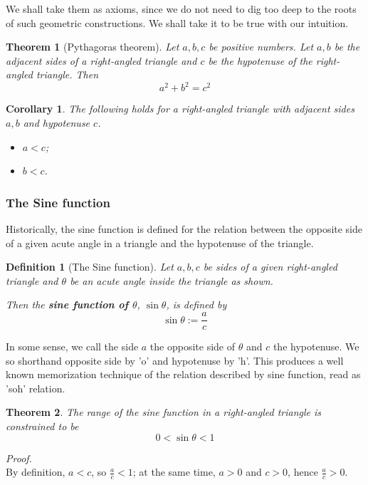 \documentclass[12pt]{article}
\newtheorem{definition}{Definition}[section]
\newtheorem*{theorem}{Theorem}
\newtheorem*{corollary}{Corollary}
\renewenvironment{proof}[1][Proof]{\begin{snugshade*} \textit{{#1}.}\\}{\hfill \qedsymbol \end{snugshade*}}
\begin{document}
    We shall take them as axioms, since we do not need to dig too deep to the roots of such geometric constructions. We shall take it to be true with our intuition.

    \begin{theorem}[Pythagoras theorem]
        Let $a,b,c$ be positive numbers. Let $a,b$ be the adjacent sides of a right-angled triangle and $c$ be the hypotenuse of the right-angled triangle. Then $$a^2+b^2=c^2$$
    \end{theorem}

    \begin{corollary}
        The following holds for a right-angled triangle with adjacent sides $a,b$ and hypotenuse $c$.
        \begin{itemize}
            \item $a<c$;
            \item $b<c$.
        \end{itemize}
    \end{corollary}

    \subsubsection*{The Sine function}

    Historically, the sine function is defined for the relation between the opposite side of a given acute angle in a triangle and the hypotenuse of the triangle.

    \begin{definition}[The Sine function]
        Let $a,b,c$ be sides of a given right-angled triangle and $\theta$ be an acute angle inside the triangle as shown.

        Then the \textbf{sine function of $\theta$}, $\sin{\theta}$, is defined by $$\sin{\theta}:=\frac{a}{c}$$
    \end{definition}

    In some sense, we call the side $a$ the opposite side of $\theta$ and $c$ the hypotenuse. We so shorthand opposite side by 'o' and hypotenuse by 'h'. This produces a well known memorization technique of the relation described by sine function, read as 'soh' relation.

    \begin{theorem}
        The range of the sine function in a right-angled triangle is constrained to be $$0<\sin{\theta}<1$$
    \end{theorem}

    \begin{proof}
        By definition, $a<c$, so $\frac{a}{c}<1$; at the same time, $a>0$ and $c>0$, hence $\frac{a}{c}>0$.
    \end{proof}
\end{document}
